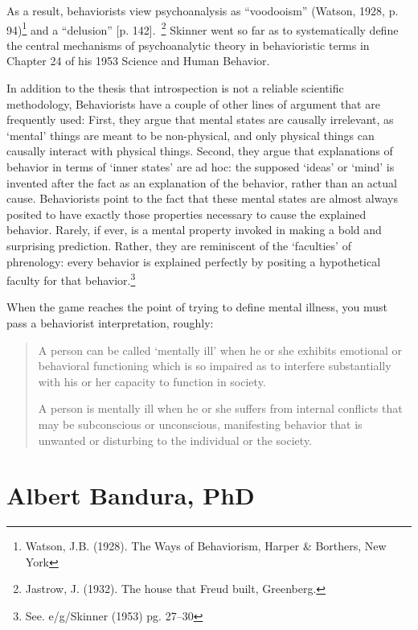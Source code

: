 \begin{refsection}
As a result, behaviorists view psychoanalysis as “voodooism” (Watson, 1928, p. 94)\footnote{Watson, J.B. (1928). The Ways of Behaviorism, Harper \& Borthers, New York} and a “delusion” [p. 142].~\citep{Jastrow:1932wl}\footnote{Jastrow, J. (1932). The house that Freud built, Greenberg.} Skinner went so far as to systematically define the central mechanisms of psychoanalytic theory in behavioristic terms in Chapter 24 of his 1953 Science and Human Behavior.

In addition to the thesis that introspection is not a reliable scientific methodology, Behaviorists have a couple of other lines of argument that are frequently used: First, they argue that mental states are causally irrelevant, as `mental' things are meant to be non-physical, and only physical things can causally interact with physical things. Second, they argue that explanations of behavior in terms of `inner states' are ad hoc: the supposed `ideas' or `mind' is invented after the fact as an explanation of the behavior, rather than an actual cause. Behaviorists point to the fact that these mental states are almost always posited to have exactly those properties necessary to cause the explained behavior. Rarely, if ever, is a mental property invoked in making a bold and surprising prediction. Rather, they are reminiscent of the `faculties' of phrenology: every behavior is explained perfectly by positing a hypothetical faculty for that behavior.\footnote{See. e\slash g\slash  Skinner (1953) pg. 27--30} 

When the game reaches the point of trying to define mental illness, you must pass a behaviorist interpretation, roughly:

\begin{quote}

A person can be called `mentally ill' when he or she exhibits emotional or behavioral functioning which is so impaired as to interfere substantially with his or her capacity to function in society.
\begin{proposal}[Behaviorists]\label{proposal:behaviorists}A person is mentally ill when he or she suffers from internal conflicts that may be subconscious or unconscious, manifesting behavior that is unwanted or disturbing to the individual or the society.\end{proposal}
\end{quote}

\chapter{Albert Bandura, PhD}
\label{albertbanduraphd}


\end{refsection}
